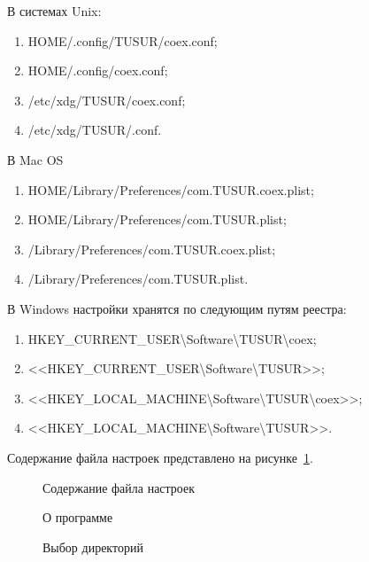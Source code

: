   В системах Unix:
\begin{enumerate}
  \item HOME/.config/TUSUR/coex.conf;
  \item HOME/.config/coex.conf;
  \item /etc/xdg/TUSUR/coex.conf;
  \item /etc/xdg/TUSUR/.conf.
\end{enumerate}

  В Mac OS
\begin{enumerate}
  \item HOME/Library/Preferences/com.TUSUR.coex.plist;
  \item HOME/Library/Preferences/com.TUSUR.plist;
  \item /Library/Preferences/com.TUSUR.coex.plist;
  \item /Library/Preferences/com.TUSUR.plist.
\end{enumerate}

  В Windows настройки хранятся по следующим путям реестра:
\begin{enumerate}
  \item HKEY\_CURRENT\_USER\textbackslash Software\textbackslash TUSUR\textbackslash coex;
  \item <<HKEY\_CURRENT\_USER\textbackslash Software\textbackslash TUSUR>>;
  \item <<HKEY\_LOCAL\_MACHINE\textbackslash Software\textbackslash TUSUR\textbackslash coex>>;
  \item <<HKEY\_LOCAL\_MACHINE\textbackslash Software\textbackslash TUSUR>>.
\end{enumerate}
  

Содержание файла настроек представлено на рисунке~\ref{ship_25:ship_25}.

\begin{figure}[h!]
\caption{ Содержание файла настроек }
\label{ship_25:ship_25}
\end{figure}  

\begin{figure}[h!]
\caption{ О программе }
\label{ship_4:ship_4}
\end{figure}

\begin{figure}[h!]
\caption{ Выбор директорий }
\label{ship_5:ship_5}
\end{figure}

